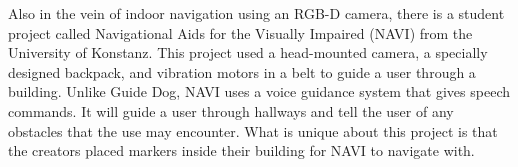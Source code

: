 Also in the vein of indoor navigation using an RGB-D camera, there is a student
project called Navigational Aids for the Visually Impaired (NAVI)
\cite{navi-website} from the University of Konstanz. This project used a
head-mounted camera, a specially designed backpack, and vibration motors in a
belt to guide a user through a building. Unlike Guide Dog, NAVI uses a voice
guidance system that gives speech commands. It will guide a user through
hallways and tell the user of any obstacles that the use may encounter. What is
unique about this project is that the creators placed markers inside their
building for NAVI to navigate with.
